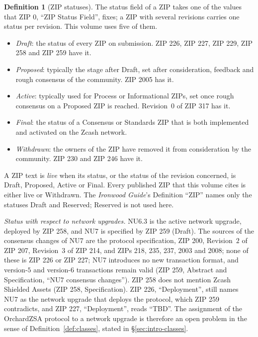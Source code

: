 \documentclass[11pt,a4paper]{article}
\theoremstyle{definition}
\newtheorem{definition}[theorem]{Definition}
\begin{document}
\begin{definition}[ZIP statuses]\label{def:zip-status}
The status field of a ZIP takes one of the values that ZIP 0, ``ZIP Status
Field'', fixes; a ZIP with several revisions carries one status per
revision. This volume uses five of them.
\begin{itemize}
\item \emph{Draft}: the status of every ZIP on submission. ZIP 226, ZIP
  227, ZIP 229, ZIP 258 and ZIP 259 have it.
\item \emph{Proposed}: typically the stage after Draft, set after
  consideration, feedback and rough consensus of the community. ZIP 2005 has
  it.
\item \emph{Active}: typically used for Process or Informational ZIPs, set
  once rough consensus on a Proposed ZIP is reached. Revision~$0$ of ZIP 317
  has it.
\item \emph{Final}: the status of a Consensus or Standards ZIP that is both
  implemented and activated on the Zcash network.
\item \emph{Withdrawn}: the owners of the ZIP have removed it from
  consideration by the community. ZIP 230 and ZIP 246 have it.
\end{itemize}
A ZIP text is \emph{live} when its status, or the status of the revision
concerned, is Draft, Proposed, Active or Final. Every published ZIP that
this volume cites is either live or Withdrawn. The \emph{Ironwood Guide}'s
Definition ``ZIP'' names only the statuses Draft and Reserved; Reserved is not
used here.
\end{definition}

\emph{Status with respect to network upgrades.} NU6.3 is the active network
upgrade, deployed by ZIP 258, and NU7 is specified by ZIP 259 (Draft). The
sources of the consensus changes of NU7 are the protocol specification, ZIP
200, Revision~$2$ of ZIP 207, Revision~$3$ of ZIP 214, and ZIPs 218, 235,
237, 2003 and 2008; none of these is ZIP 226 or ZIP 227; NU7 introduces no
new transaction format, and version-$5$ and version-$6$ transactions remain
valid (ZIP 259, Abstract and Specification, ``NU7 consensus changes''). ZIP
258 does not mention Zcash Shielded Assets (ZIP 258, Specification). ZIP
226, ``Deployment'', still names NU7 as the network upgrade that deploys the
protocol, which ZIP 259 contradicts, and ZIP 227, ``Deployment'', reads
``TBD''. The assignment of the OrchardZSA protocol to
a network upgrade is therefore an open problem in the sense of
Definition~\ref{def:classes}, stated in \S\ref{sec:intro-classes}.
\end{document}
